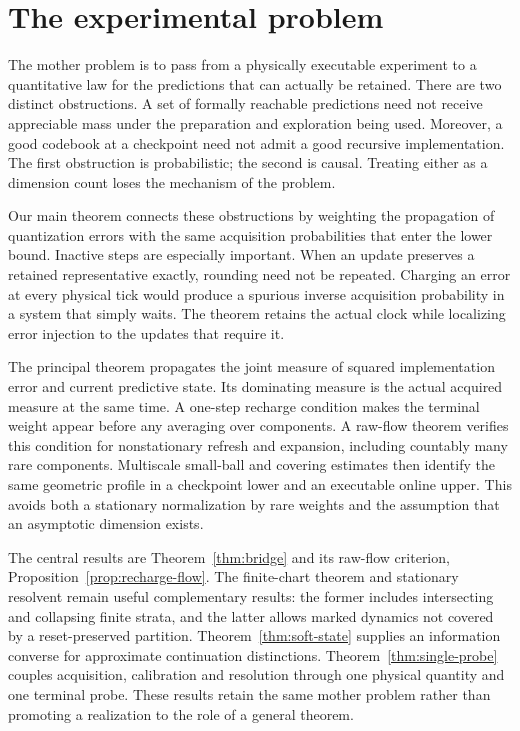 \section{The experimental problem}\label{sec:experiment}
The mother problem is to pass from a physically executable experiment to a quantitative law for the predictions that can actually be retained. There are two distinct obstructions. A set of formally reachable predictions need not receive appreciable mass under the preparation and exploration being used. Moreover, a good codebook at a checkpoint need not admit a good recursive implementation. The first obstruction is probabilistic; the second is causal. Treating either as a dimension count loses the mechanism of the problem.

Our main theorem connects these obstructions by weighting the propagation of quantization errors with the same acquisition probabilities that enter the lower bound. Inactive steps are especially important. When an update preserves a retained representative exactly, rounding need not be repeated. Charging an error at every physical tick would produce a spurious inverse acquisition probability in a system that simply waits. The theorem retains the actual clock while localizing error injection to the updates that require it.

The principal theorem propagates the joint measure of squared implementation error and current predictive state. Its dominating measure is the actual acquired measure at the same time. A one-step recharge condition makes the terminal weight appear before any averaging over components. A raw-flow theorem verifies this condition for nonstationary refresh and expansion, including countably many rare components. Multiscale small-ball and covering estimates then identify the same geometric profile in a checkpoint lower and an executable online upper. This avoids both a stationary normalization by rare weights and the assumption that an asymptotic dimension exists.

The central results are Theorem~\ref{thm:bridge} and its raw-flow criterion, Proposition~\ref{prop:recharge-flow}. The finite-chart theorem and stationary resolvent remain useful complementary results: the former includes intersecting and collapsing finite strata, and the latter allows marked dynamics not covered by a reset-preserved partition. Theorem~\ref{thm:soft-state} supplies an information converse for approximate continuation distinctions. Theorem~\ref{thm:single-probe} couples acquisition, calibration and resolution through one physical quantity and one terminal probe. These results retain the same mother problem rather than promoting a realization to the role of a general theorem.


